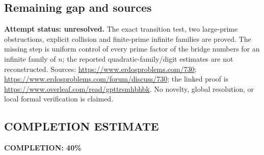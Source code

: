 \subsection*{Remaining gap and sources}
\textbf{Attempt status: unresolved.} The exact transition test, two large-prime obstructions, explicit collision and finite-prime infinite families are proved. The missing step is uniform control of every prime factor of the bridge numbers for an infinite family of $n$; the reported quadratic-family/digit estimates are not reconstructed.
Sources: \url{https://www.erdosproblems.com/730}; \url{https://www.erdosproblems.com/forum/discuss/730}; the linked proof is \url{https://www.overleaf.com/read/gpttrsmhbhbk}. No novelty, global resolution, or local formal verification is claimed.

\subsection*{COMPLETION ESTIMATE}
\textbf{COMPLETION: 40\%}

